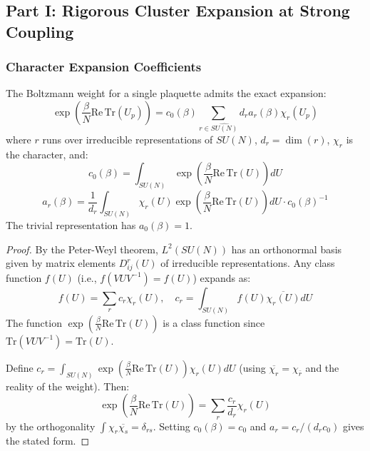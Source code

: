 \subsection{Part I: Rigorous Cluster Expansion at Strong Coupling}
\label{subsec:cluster_expansion_rigorous}

\subsubsection{Character Expansion Coefficients}

\begin{lemma}
\label{lem:character_expansion}
The Boltzmann weight for a single plaquette admits the exact expansion:
\begin{equation}
\exp\left(\frac{\beta}{N} \mathrm{Re}\,\mathrm{Tr}(U_p)\right) = c_0(\beta) \sum_{r \in \widehat{SU(N)}} d_r a_r(\beta) \chi_r(U_p)
\end{equation}
where $r$ runs over irreducible representations of $SU(N)$, $d_r = \dim(r)$, $\chi_r$ is the character, and:
\begin{equation}
c_0(\beta) = \int_{SU(N)} \exp\left(\frac{\beta}{N} \mathrm{Re}\,\mathrm{Tr}(U)\right) dU
\end{equation}
\begin{equation}
a_r(\beta) = \frac{1}{d_r} \int_{SU(N)} \chi_r(U) \exp\left(\frac{\beta}{N} \mathrm{Re}\,\mathrm{Tr}(U)\right) dU \cdot c_0(\beta)^{-1}
\end{equation}
The trivial representation has $a_0(\beta) = 1$.
\end{lemma}

\begin{proof}
By the Peter-Weyl theorem, $L^2(SU(N))$ has an orthonormal basis given by matrix elements $D^r_{ij}(U)$ of irreducible representations. Any class function $f(U)$ (i.e., $f(VUV^{-1}) = f(U)$) expands as:
\begin{equation}
f(U) = \sum_r c_r \chi_r(U), \quad c_r = \int_{SU(N)} f(U) \overline{\chi_r(U)} dU
\end{equation}
The function $\exp\left(\frac{\beta}{N}\mathrm{Re}\,\mathrm{Tr}(U)\right)$ is a class function since $\mathrm{Tr}(VUV^{-1}) = \mathrm{Tr}(U)$.

Define $c_r = \int_{SU(N)} \exp\left(\frac{\beta}{N}\mathrm{Re}\,\mathrm{Tr}(U)\right) \chi_r(U) dU$ (using $\overline{\chi_r} = \chi_{\bar{r}}$ and the reality of the weight). Then:
\begin{equation}
\exp\left(\frac{\beta}{N}\mathrm{Re}\,\mathrm{Tr}(U)\right) = \sum_r \frac{c_r}{d_r} \chi_r(U)
\end{equation}
by the orthogonality $\int \chi_r \overline{\chi_s} = \delta_{rs}$. Setting $c_0(\beta) = c_0$ and $a_r = c_r/(d_r c_0)$ gives the stated form.
\end{proof}

